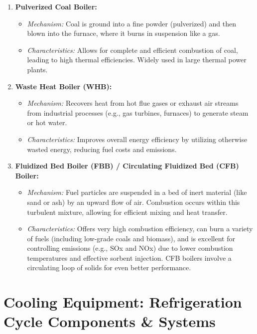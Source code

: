 \begin{enumerate}
\begin{itemize}
            \item \textit{Characteristics:} Efficient for burning a wide range of solid fuels.
        \end{itemize}
    \item \textbf{Pulverized Coal Boiler:}
        \begin{itemize}
            \item \textit{Mechanism:} Coal is ground into a fine powder (pulverized) and then blown into the furnace, where it burns in suspension like a gas.
            \item \textit{Characteristics:} Allows for complete and efficient combustion of coal, leading to high thermal efficiencies. Widely used in large thermal power plants.
        \end{itemize}
    \item \textbf{Waste Heat Boiler (WHB):}
        \begin{itemize}
            \item \textit{Mechanism:} Recovers heat from hot flue gases or exhaust air streams from industrial processes (e.g., gas turbines, furnaces) to generate steam or hot water.
            \item \textit{Characteristics:} Improves overall energy efficiency by utilizing otherwise wasted energy, reducing fuel costs and emissions.
        \end{itemize}
    \item \textbf{Fluidized Bed Boiler (FBB) / Circulating Fluidized Bed (CFB) Boiler:}
        \begin{itemize}
            \item \textit{Mechanism:} Fuel particles are suspended in a bed of inert material (like sand or ash) by an upward flow of air. Combustion occurs within this turbulent mixture, allowing for efficient mixing and heat transfer.
            \item \textit{Characteristics:} Offers very high combustion efficiency, can burn a variety of fuels (including low-grade coals and biomass), and is excellent for controlling emissions (e.g., SOx and NOx) due to lower combustion temperatures and effective sorbent injection. CFB boilers involve a circulating loop of solids for even better performance.
        \end{itemize}
\end{enumerate}

\section{Cooling Equipment: Refrigeration Cycle Components \& Systems}

